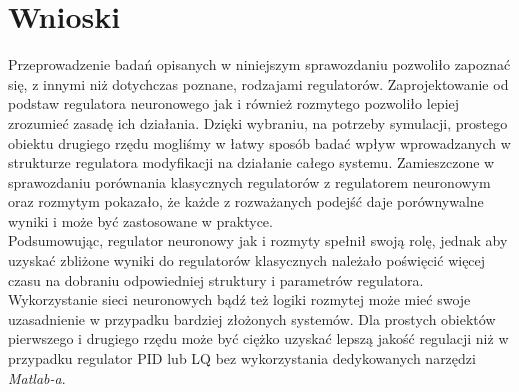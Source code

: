 \chapter{Wnioski}
Przeprowadzenie badań opisanych w niniejszym sprawozdaniu pozwoliło zapoznać się, z innymi niż dotychczas poznane, rodzajami regulatorów. Zaprojektowanie od podstaw regulatora neuronowego jak i również rozmytego pozwoliło lepiej zrozumieć zasadę ich działania. Dzięki wybraniu, na potrzeby symulacji, prostego obiektu drugiego rzędu mogliśmy w łatwy sposób badać wpływ wprowadzanych w strukturze regulatora modyfikacji na działanie całego systemu. Zamieszczone w sprawozdaniu porównania klasycznych regulatorów z regulatorem neuronowym oraz rozmytym pokazało, że każde z rozważanych podejść daje porównywalne wyniki i może być zastosowane w praktyce. \\
Podsumowując, regulator neuronowy jak i rozmyty spełnił swoją rolę, jednak aby uzyskać zbliżone wyniki do regulatorów klasycznych należało poświęcić więcej czasu na dobraniu odpowiedniej struktury i parametrów regulatora. Wykorzystanie sieci neuronowych bąd\'z też logiki rozmytej może mieć swoje uzasadnienie w przypadku bardziej złożonych systemów. Dla prostych obiektów pierwszego i drugiego rzędu może być ciężko uzyskać lepszą jakość regulacji niż w przypadku regulator PID lub LQ bez wykorzystania dedykowanych narzędzi \textit{Matlab-a}.